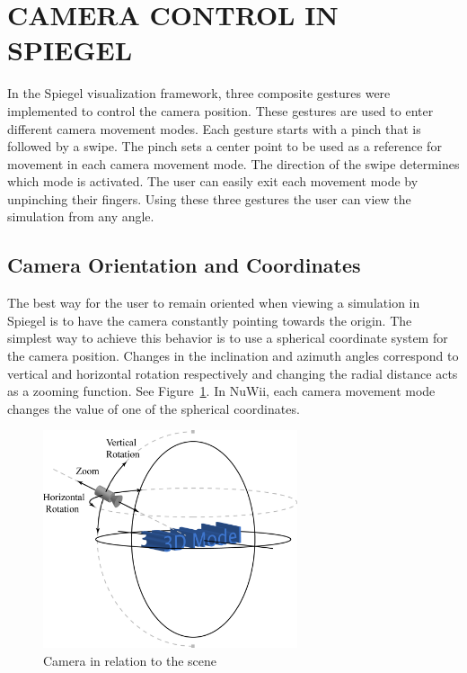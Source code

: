 \documentclass[a4paper,twoside]{article}
\begin{document}
\section{\uppercase{Camera Control in Spiegel}}
In the Spiegel visualization framework, three composite gestures were implemented to control the camera position. These gestures are used to enter different camera movement modes. Each gesture starts with a pinch that is followed by a swipe. The pinch sets a center point to be used as a reference for movement in each camera movement mode. The direction of the swipe determines which mode is activated. The user can easily exit each movement mode by unpinching their fingers. Using these three gestures the user can view the simulation from any angle.

\subsection{Camera Orientation and Coordinates} 
The best way for the user to remain oriented when viewing a simulation in Spiegel is to have the camera constantly pointing towards the origin. The simplest way to achieve this behavior is to use a spherical coordinate system for the camera position. Changes in the inclination and azimuth angles correspond to vertical and horizontal rotation respectively and changing the radial distance acts as a zooming function. See Figure~\ref{camera}. In NuWii, each camera movement mode changes the value of one of the spherical coordinates.

\begin{figure}[h]
    \begin{center}
        \includegraphics[width = 7.5cm]{Camera}
    \end{center}
    \caption{Camera in relation to the scene}
    \label{camera}
\end{figure}
\end{document}
